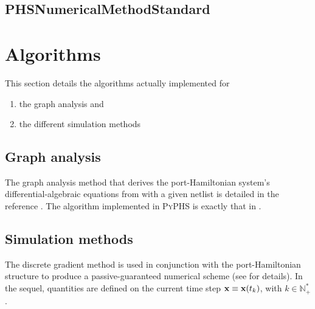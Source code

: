 \documentclass[10pt,a4paper]{article}
\begin{document}
{\subsection{PHSNumericalMethodStandard}
\appendix
\section{Algorithms}
%
This section details the algorithms actually implemented for 
%
\begin{enumerate}
%
\item the graph analysis and\\
%
\item the different simulation methods
%
\end{enumerate}
%
\subsection{Graph analysis}
%
The graph analysis method that derives the port-Hamiltonian system's differential-algebraic equations from with a given netlist is detailed in the reference \cite{falaize2016apassive}.
%
The algorithm implemented in \textsc{PyPHS} is exactly that in \cite[algorithm 1]{falaize2016apassive}.
%
\subsection{Simulation methods}
%
The discrete gradient method is used in conjunction with the port-Hamiltonian structure to produce a passive-guaranteed numerical scheme (see \cite{falaize2016apassive} for details).
%
In the sequel, quantities are defined on the current time step ${\mathbf{x}}\equiv{\mathbf{x}}(t_k)$, with $k\in\mathbb{N}_{+}^{*}$.
%
}
\end{document}
